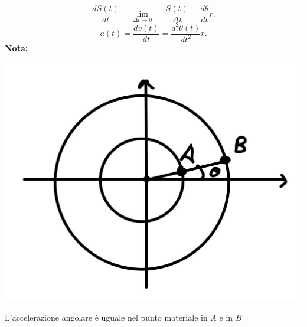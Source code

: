 \documentclass[12px]{article}
\begin{document}
	\[
		\frac{ dS(t)}{dt} = \lim_{\Delta t \rightarrow 0} = \frac{S(t)}{\Delta t} = \frac {d\theta}{dt} r
	.\] 
	\[
		a(t) = \frac{dv(t)}{dt} = \frac{d^2\theta(t)}{dt^2}r
	.\] 
	\textbf{Nota:}\\
	\begin{center}
		\includegraphics[scale=0.1]{grafico_6}
	\end{center}
L'accelerazione angolare è uguale nel punto materiale in $A$ e in $B$\\
\end{document}
